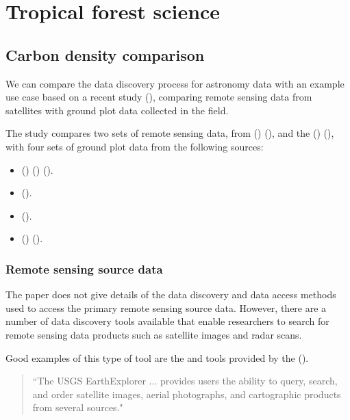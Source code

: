 \documentclass{article}
\begin{document}
\section{Tropical forest science}

\subsection{Carbon density comparison}

We can compare the \cite{vo} data discovery process for astronomy data with
an example use case based on a recent study 
(\cite{mitchard-2014}), comparing remote sensing data from satellites with
ground plot data collected in the field.

The study compares two sets of remote sensing data,
from  (\cite{nasa-jpl-carbon})
 (\cite{saatchi-2011}), and the 
(\cite{whrc})  (\cite{baccini-2012}), with four
sets of ground plot data from the following sources:

\begin{itemize}
    \item{} (\cite{rainfor}) (\cite{peacock-2007})
    (\cite{malhi-2009}).
    \item{} (\cite{atdn}).
    \item{} (\cite{team}).
    \item{} (\cite{ppbio}) (\cite{pezzini-2012}).
\end{itemize}

\subsubsection{Remote sensing source data}

The paper does not give details of the data discovery and data access
methods used to access the primary remote sensing source data.
However, there are a number of data discovery tools available that enable
researchers to search for remote sensing data products such as satellite
images and radar scans.

Good examples of this type of tool are the \cite{usgs-explorer} and
\cite{usgs-glovis} tools provided by the  (\cite{usgs}).

\begin{quote}
``The USGS EarthExplorer ... provides users the ability to query, search,
and order satellite images, aerial photographs, and cartographic products
from several sources."
\end{quote}
\end{document}
